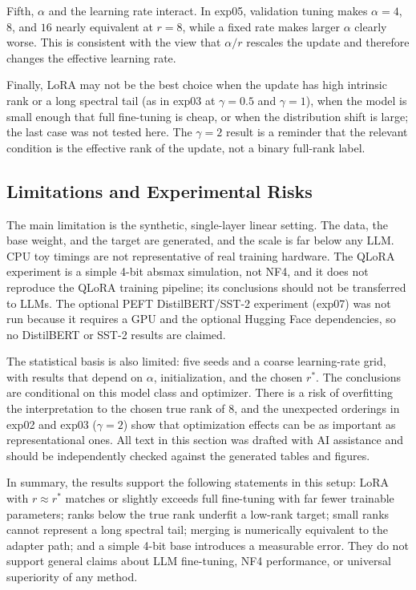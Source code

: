 Fifth, $\alpha$ and the learning rate interact. In exp05, validation tuning makes $\alpha=4$, $8$, and $16$ nearly equivalent at $r=8$, while a fixed rate makes larger $\alpha$ clearly worse. This is consistent with the view that $\alpha/r$ rescales the update and therefore changes the effective learning rate.

Finally, LoRA may not be the best choice when the update has high intrinsic rank or a long spectral tail (as in exp03 at $\gamma=0.5$ and $\gamma=1$), when the model is small enough that full fine-tuning is cheap, or when the distribution shift is large; the last case was not tested here. The $\gamma=2$ result is a reminder that the relevant condition is the effective rank of the update, not a binary full-rank label.

\subsection{Limitations and Experimental Risks}

The main limitation is the synthetic, single-layer linear setting. The data, the base weight, and the target are generated, and the scale is far below any LLM. CPU toy timings are not representative of real training hardware. The QLoRA experiment is a simple 4-bit absmax simulation, not NF4, and it does not reproduce the QLoRA training pipeline; its conclusions should not be transferred to LLMs. The optional PEFT DistilBERT/SST-2 experiment (exp07) was not run because it requires a GPU and the optional Hugging Face dependencies, so no DistilBERT or SST-2 results are claimed.

The statistical basis is also limited: five seeds and a coarse learning-rate grid, with results that depend on $\alpha$, initialization, and the chosen $r^{*}$. The conclusions are conditional on this model class and optimizer. There is a risk of overfitting the interpretation to the chosen true rank of $8$, and the unexpected orderings in exp02 and exp03 ($\gamma=2$) show that optimization effects can be as important as representational ones. All text in this section was drafted with AI assistance and should be independently checked against the generated tables and figures.

In summary, the results support the following statements in this setup: LoRA with $r\approx r^{*}$ matches or slightly exceeds full fine-tuning with far fewer trainable parameters; ranks below the true rank underfit a low-rank target; small ranks cannot represent a long spectral tail; merging is numerically equivalent to the adapter path; and a simple 4-bit base introduces a measurable error. They do not support general claims about LLM fine-tuning, NF4 performance, or universal superiority of any method.

